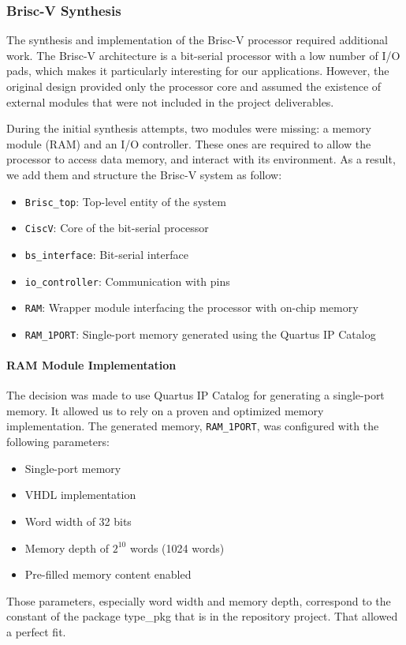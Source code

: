 \documentclass[12pt]{article}
\begin{document}
\subsubsection{Brisc-V Synthesis}

The synthesis and implementation of the Brisc-V processor required additional work. The Brisc-V architecture is a bit-serial processor with a low number of I/O pads, which makes it particularly interesting for our applications. However, the original design provided only the processor core and assumed the existence of external modules that were not included in the project deliverables.

During the initial synthesis attempts, two modules were missing: a memory module (RAM) and an I/O controller. These ones are required to allow the processor to access data memory, and interact with its environment. As a result, we add them and structure the Brisc-V system as follow:

\begin{itemize}
    \item \texttt{Brisc\_top}: Top-level entity of the system
    \item \texttt{CiscV}: Core of the bit-serial processor
    \item \texttt{bs\_interface}: Bit-serial interface
    \item \texttt{io\_controller}: Communication with pins
    \item \texttt{RAM}: Wrapper module interfacing the processor with on-chip memory
    \item \texttt{RAM\_1PORT}: Single-port memory generated using the Quartus IP Catalog
\end{itemize}

\paragraph{RAM Module Implementation}

The decision was made to use Quartus IP Catalog for generating a single-port memory. It allowed us to rely on a proven and optimized memory implementation. The generated memory, \texttt{RAM\_1PORT}, was configured with the following parameters:
\begin{itemize}
    \item Single-port memory
    \item VHDL implementation
    \item Word width of 32 bits
    \item Memory depth of $2^{10}$ words (1024 words)
    \item Pre-filled memory content enabled
\end{itemize}
Those parameters, especially word width and memory depth, correspond to the constant of the package type\_pkg that is in the repository project. That allowed a perfect fit.
\end{document}
